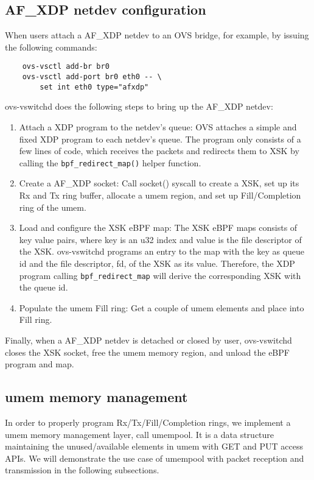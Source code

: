 \documentclass[10pt,numbers,reprint]{sigplanconf}
\begin{document}
\subsection{AF\_XDP netdev configuration}
When users attach a AF\_XDP netdev to an OVS bridge, for example, by
issuing the following commands:
{\small
\begin{verbatim}
    ovs-vsctl add-br br0
    ovs-vsctl add-port br0 eth0 -- \
        set int eth0 type="afxdp"
\end{verbatim}
}
ovs-vswitchd does the following steps to bring up the
AF\_XDP netdev:
\begin{enumerate}
\item Attach a XDP program to the netdev's queue:
OVS attaches a simple and fixed XDP program to each netdev's queue.
The program only consists of a few lines of code, which receives the
packets and redirects them to XSK by calling the \texttt{bpf\_redirect\_map()}
helper function.

\item Create a AF\_XDP socket:
Call socket() syscall to create a XSK,
set up its Rx and Tx ring buffer, allocate a umem region,
and set up Fill/Completion ring of the umem.

\item Load and configure the XSK eBPF map:
The XSK eBPF maps consists of key value pairs, where key is an u32 index and
value is the file descriptor of the XSK.  ovs-vswitchd programs an entry to
the map with the key as queue id and the file descriptor, fd, of the XSK as
its value.
Therefore, the XDP program calling \texttt{bpf\_redirect\_map} will derive
the corresponding XSK with the queue id.

\item Populate the umem Fill ring: Get a couple of umem elements and place into Fill ring.
\end{enumerate}
Finally, when a AF\_XDP netdev is detached or closed by user,
ovs-vswitchd closes the XSK socket, free the umem memory region, and
unload the eBPF program and map.

\subsection{umem memory management}
In order to properly program Rx/Tx/Fill/Completion rings, we implement a
umem memory management layer, call umempool. It is a data structure
maintaining the unused/available elements in umem with GET and PUT access
APIs. We will demonstrate the use case of umempool with packet reception and
transmission in the following subsections.
\end{document}
